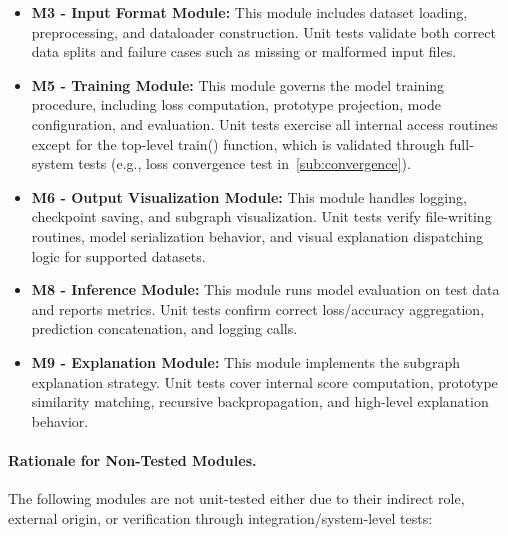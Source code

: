 \documentclass[12pt, titlepage]{article}
\begin{document}
\begin{itemize}
  \item \textbf{M3 - Input Format Module:} This module includes dataset loading, preprocessing, and dataloader construction. Unit tests validate both correct data splits and failure cases such as missing or malformed input files.

  \item \textbf{M5 - Training Module:} This module governs the model training procedure, including loss computation, prototype projection, mode configuration, and evaluation. Unit tests exercise all internal access routines except for the top-level train() function, which is validated through full-system tests (e.g., loss convergence test in~\ref{sub:convergence}).
  
  \item \textbf{M6 - Output Visualization Module:} This module handles logging, checkpoint saving, and subgraph visualization. Unit tests verify file-writing routines, model serialization behavior, and visual explanation dispatching logic for supported datasets.
  
  \item \textbf{M8 - Inference Module:} This module runs model evaluation on test data and reports metrics. Unit tests confirm correct loss/accuracy aggregation, prediction concatenation, and logging calls.
  
  \item \textbf{M9 - Explanation Module:} This module implements the subgraph explanation strategy. Unit tests cover internal score computation, prototype similarity matching, recursive backpropagation, and high-level explanation behavior.
\end{itemize}

\paragraph{Rationale for Non-Tested Modules.}
The following modules are not unit-tested either due to their indirect role, external origin, or verification through integration/system-level tests:
\end{document}
